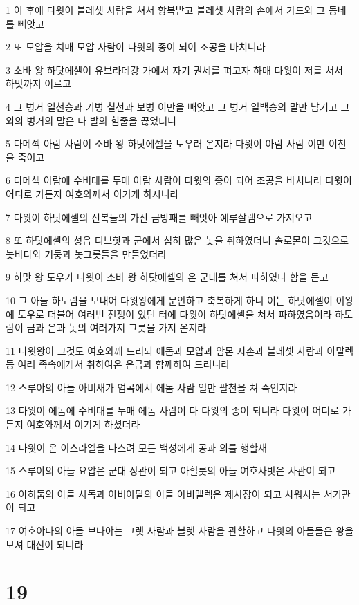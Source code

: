 \par 1 이 후에 다윗이 블레셋 사람을 쳐서 항복받고 블레셋 사람의 손에서 가드와 그 동네를 빼앗고
\par 2 또 모압을 치매 모압 사람이 다윗의 종이 되어 조공을 바치니라
\par 3 소바 왕 하닷에셀이 유브라데강 가에서 자기 권세를 펴고자 하매 다윗이 저를 쳐서 하맛까지 이르고
\par 4 그 병거 일천승과 기병 칠천과 보병 이만을 빼앗고 그 병거 일백승의 말만 남기고 그 외의 병거의 말은 다 발의 힘줄을 끊었더니
\par 5 다메섹 아람 사람이 소바 왕 하닷에셀을 도우러 온지라 다윗이 아람 사람 이만 이천을 죽이고
\par 6 다메섹 아람에 수비대를 두매 아람 사람이 다윗의 종이 되어 조공을 바치니라 다윗이 어디로 가든지 여호와께서 이기게 하시니라
\par 7 다윗이 하닷에셀의 신복들의 가진 금방패를 빼앗아 예루살렘으로 가져오고
\par 8 또 하닷에셀의 성읍 디브핫과 군에서 심히 많은 놋을 취하였더니 솔로몬이 그것으로 놋바다와 기둥과 놋그릇들을 만들었더라
\par 9 하맛 왕 도우가 다윗이 소바 왕 하닷에셀의 온 군대를 쳐서 파하였다 함을 듣고
\par 10 그 아들 하도람을 보내어 다윗왕에게 문안하고 축복하게 하니 이는 하닷에셀이 이왕에 도우로 더불어 여러번 전쟁이 있던 터에 다윗이 하닷에셀을 쳐서 파하였음이라 하도람이 금과 은과 놋의 여러가지 그릇을 가져 온지라
\par 11 다윗왕이 그것도 여호와께 드리되 에돔과 모압과 암몬 자손과 블레셋 사람과 아말렉등 여러 족속에게서 취하여온 은금과 함께하여 드리니라
\par 12 스루야의 아들 아비새가 염곡에서 에돔 사람 일만 팔천을 쳐 죽인지라
\par 13 다윗이 에돔에 수비대를 두매 에돔 사람이 다 다윗의 종이 되니라 다윗이 어디로 가든지 여호와께서 이기게 하셨더라
\par 14 다윗이 온 이스라엘을 다스려 모든 백성에게 공과 의를 행할새
\par 15 스루야의 아들 요압은 군대 장관이 되고 아힐룻의 아들 여호사밧은 사관이 되고
\par 16 아히둡의 아들 사독과 아비아달의 아들 아비멜렉은 제사장이 되고 사워사는 서기관이 되고
\par 17 여호야다의 아들 브나야는 그렛 사람과 블렛 사람을 관할하고 다윗의 아들들은 왕을 모셔 대신이 되니라

\chapter{19}

